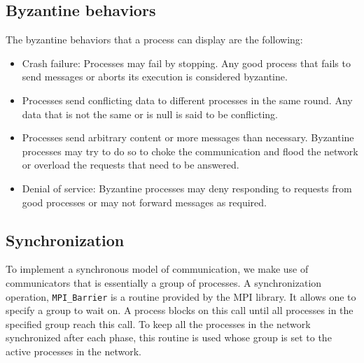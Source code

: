 \subsection{Byzantine behaviors}
\label{sec:behavior}
The byzantine behaviors that a process can display are the following:
\begin{itemize}
    \item Crash failure: Processes may fail by stopping. Any good process that fails to send messages or aborts its execution is considered byzantine.
    \item Processes send conflicting data to different processes in the same round. Any data that is not the same or is null is said to be conflicting.
    \item Processes send arbitrary content or more messages than necessary. Byzantine processes may try to do so to choke the communication and flood the network or overload the requests that need to be answered.
    \item Denial of service: Byzantine processes may deny responding to requests from good processes or may not forward messages as required. 
\end{itemize}

\subsection{Synchronization}
To implement a synchronous model of communication, we make use of communicators that is essentially a group of processes. A synchronization operation, \texttt{MPI\_Barrier} is a routine provided by the MPI library. It allows one to specify a group to wait on. A process blocks on this call until all processes in the specified group reach this call. To keep all the processes in the network synchronized after each phase, this routine is used whose group is set to the active processes in the network.



